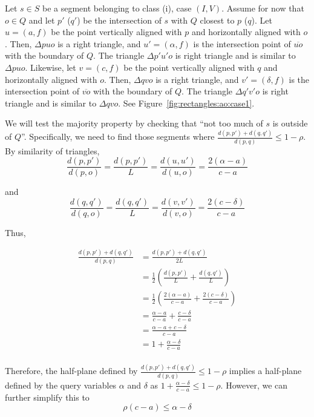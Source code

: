 Let $s \in S$ be a segment belonging to class (i), case $(I, V)$.
Assume for now that $o \in Q$ and let $p'$ ($q'$) be the intersection of $s$ with $Q$ closest to $p$ ($q$).  
Let $u = (a, f)$ be the point vertically aligned with $p$ and horizontally aligned with $o$. Then, $\Delta p u o$ is a right triangle, and $u' = (\alpha, f)$ is the intersection point of $\overline{u o}$ with the boundary of $Q$.  
The triangle $\Delta p' u' o$ is right triangle and is similar to $\Delta p u o$. 
Likewise, let $v = (c, f)$ be the point vertically aligned with $q$ and horizontally aligned with $o$. Then, $\Delta q v o$ is a right triangle, and $v' = (\delta, f)$ is the intersection point of $\overline{v o}$ with the boundary of $Q$. The triangle $\Delta q' v' o$ is right triangle and is similar to $\Delta q v o$. See Figure~\ref{fig:rectangles:ao:case1}.

We will test the majority property by checking that ``not too much of $s$ is outside of $Q$''. Specifically, we need to find those segments where $\frac{d(p, p') + d(q, q')}{d(p, q)} \leq 1 - \rho$. By similarity of triangles, 
\[ 
\frac{d(p, p')}{d(p, o)} = \frac{d(p, p')}{L} = \frac{d(u, u')}{d(u, o)} = \frac{2(\alpha - a)}{c - a}
\]

\noindent and 
\[ 
\frac{d(q, q')}{d(q, o)} = \frac{d(q, q')}{L} = \frac{d(v, v')}{d(v, o)} = \frac{2(c - \delta)}{c - a}
\]

\noindent Thus,

\[
\begin{split} 
\frac{d(p, p') + d(q, q')}{d(p, q)}
%
&= \frac{d(p, p') + d(q, q')}{2L} \\
%
&= \frac{1}{2} \left ( \frac{d(p, p')}{L} + \frac{d(q, q')}{L} \right ) \\
%
&= \frac{1}{2} \left ( \frac{2(\alpha - a)}{c - a} + \frac{2(c - \delta)}{c - a} \right ) \\
%
&= \frac{\alpha - a}{c - a} + \frac{c - \delta}{c - a} \\
%
&= \frac{\alpha - a + c - \delta}{c - a} \\
%
&= 1 + \frac{\alpha - \delta}{c - a} \\
%
\end{split}
\]

Therefore, the half-plane defined by $\frac{d(p, p') + d(q, q')}{d(p, q)} \leq 1 - \rho$ implies a half-plane defined by the query variables $\alpha$ and $\delta$ as $1 + \frac{\alpha - \delta}{c - a} \leq 1 - \rho$.  However, we can further simplify this to
\[ 
\rho(c - a) \leq \alpha - \delta 
\]

